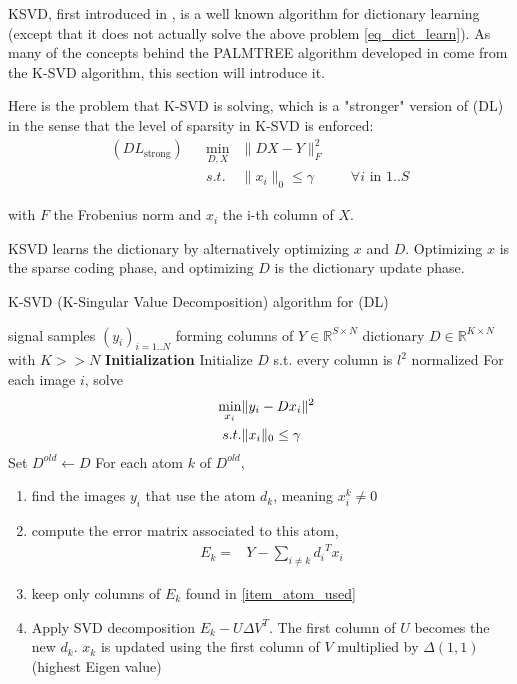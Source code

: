 \ac{KSVD}, first introduced in \cite{aharon_k-svd:_2006}, is a well known algorithm for dictionary learning (except that it does not actually solve the above problem \cref{eq_dict_learn}). As many of the concepts behind the PALMTREE algorithm developed in \cite{chabiron_optimization_2016} come from the K-SVD algorithm, this section will introduce it. %

Here is the problem that K-SVD is solving, which is a "stronger" version of (DL) in the sense that the level of sparsity in K-SVD is enforced:
\begin{equation*}  \begin{aligned}
(DL_{\text{strong}}) && \underset{D,X}{\min} & \lVert DX-Y \rVert^2_F \\
&& s.t. & \lVert x_i \rVert_0 \le \gamma & \quad \forall i \text{ in } 1..S
\end{aligned} \label{eq_dict_learn} \end{equation*}

with $F$ the Frobenius norm and $x_i$ the i-th column of $X$.

\ac{KSVD} learns the dictionary by alternatively optimizing $x$ and $D$. Optimizing $x$ is the sparse coding phase, and optimizing $D$ is the dictionary update phase.

\begin{algorithm}
    \caption{K-SVD (K-Singular Value Decomposition) algorithm for (DL)}
  \begin{algorithmic}[0]
    \Input signal samples $(y_i)_{i=1..N}$ forming columns of $Y \in \mathbb{R}^{S \times N}$
    \Output dictionary $D \in \mathbb{R}^{K \times N}$ with $K>>N$
    \State \textbf{Initialization} Initialize $D$ s.t. every column is $l^2$ normalized
	\State For each image $i$, solve 
		\begin{align}
			\quad \min_{x_i} & \lVert y_i-Dx_i\rVert^2\\
			s.t. & \lVert x_i \rVert_0 \le \gamma \notag
		\end{align}
	\State Set $D^{old} \leftarrow D$
	\State For each atom $k$ of $D^{old}$, 
	\begin{enumerate}[leftmargin=15mm,label=(\alph*)]
		\item find the images $y_i$ that use the atom $d_k$, meaning $x_i^k \ne 0$ \label{item_atom_used}
		\item compute the error matrix associated to this atom,
		\begin{align}
			E_k =& Y-\sum_{i\ne k} {d_i}^Tx_i
		\end{align}
		\item keep only columns of $E_k$ found in \ref{item_atom_used}
		\item Apply SVD decomposition $E_k - U \Delta V^T$. The first column of $U$ becomes the new $d_k$. $x_k$ is updated using the first column of $V$ multiplied by $\Delta(1,1)$ (highest Eigen value)
	\end{enumerate}
    \EndWhile
  \end{algorithmic}
\end{algorithm}
